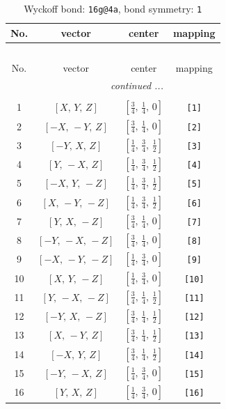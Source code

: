 \documentclass[fleqn,8pt]{jsarticle}
\begin{document}
\begin{longtable}{cccc}
\caption{Wyckoff bond: {\tt 16g@4a}, bond symmetry: {\tt 1}}
 \\
 \hline \hline
No. & vector & center & mapping \\ \hline \endfirsthead

\multicolumn{3}{l}{\tablename\ \thetable{}} \\
 \hline \hline
No. & vector & center & mapping \\ \hline \endhead

 \hline \hline
\multicolumn{3}{r}{\footnotesize\it continued ...} \\ \endfoot

 \hline \hline
\multicolumn{3}{r}{} \\ \endlastfoot

1 & $\left[ X,\, Y,\, Z \right]$ & $\left[ \frac{3}{4},\, \frac{1}{4},\, 0 \right]$ & {\tt [1]} \\ \hline
2 & $\left[ - X,\, - Y,\, Z \right]$ & $\left[ \frac{3}{4},\, \frac{1}{4},\, 0 \right]$ & {\tt [2]} \\ \hline
3 & $\left[ - Y,\, X,\, Z \right]$ & $\left[ \frac{1}{4},\, \frac{3}{4},\, \frac{1}{2} \right]$ & {\tt [3]} \\ \hline
4 & $\left[ Y,\, - X,\, Z \right]$ & $\left[ \frac{1}{4},\, \frac{3}{4},\, \frac{1}{2} \right]$ & {\tt [4]} \\ \hline
5 & $\left[ - X,\, Y,\, - Z \right]$ & $\left[ \frac{1}{4},\, \frac{3}{4},\, \frac{1}{2} \right]$ & {\tt [5]} \\ \hline
6 & $\left[ X,\, - Y,\, - Z \right]$ & $\left[ \frac{1}{4},\, \frac{3}{4},\, \frac{1}{2} \right]$ & {\tt [6]} \\ \hline
7 & $\left[ Y,\, X,\, - Z \right]$ & $\left[ \frac{3}{4},\, \frac{1}{4},\, 0 \right]$ & {\tt [7]} \\ \hline
8 & $\left[ - Y,\, - X,\, - Z \right]$ & $\left[ \frac{3}{4},\, \frac{1}{4},\, 0 \right]$ & {\tt [8]} \\ \hline
9 & $\left[ - X,\, - Y,\, - Z \right]$ & $\left[ \frac{1}{4},\, \frac{3}{4},\, 0 \right]$ & {\tt [9]} \\ \hline
10 & $\left[ X,\, Y,\, - Z \right]$ & $\left[ \frac{1}{4},\, \frac{3}{4},\, 0 \right]$ & {\tt [10]} \\ \hline
11 & $\left[ Y,\, - X,\, - Z \right]$ & $\left[ \frac{3}{4},\, \frac{1}{4},\, \frac{1}{2} \right]$ & {\tt [11]} \\ \hline
12 & $\left[ - Y,\, X,\, - Z \right]$ & $\left[ \frac{3}{4},\, \frac{1}{4},\, \frac{1}{2} \right]$ & {\tt [12]} \\ \hline
13 & $\left[ X,\, - Y,\, Z \right]$ & $\left[ \frac{3}{4},\, \frac{1}{4},\, \frac{1}{2} \right]$ & {\tt [13]} \\ \hline
14 & $\left[ - X,\, Y,\, Z \right]$ & $\left[ \frac{3}{4},\, \frac{1}{4},\, \frac{1}{2} \right]$ & {\tt [14]} \\ \hline
15 & $\left[ - Y,\, - X,\, Z \right]$ & $\left[ \frac{1}{4},\, \frac{3}{4},\, 0 \right]$ & {\tt [15]} \\ \hline
16 & $\left[ Y,\, X,\, Z \right]$ & $\left[ \frac{1}{4},\, \frac{3}{4},\, 0 \right]$ & {\tt [16]} \\
\end{longtable}
\end{document}
